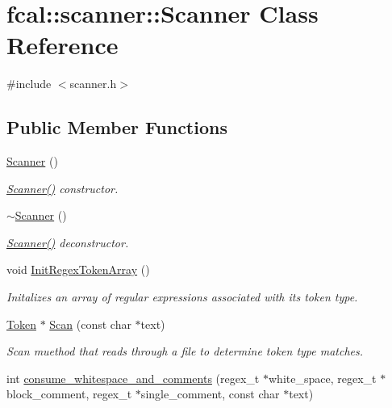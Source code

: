 \hypertarget{classfcal_1_1scanner_1_1Scanner}{}\section{fcal\+:\+:scanner\+:\+:Scanner Class Reference}
\label{classfcal_1_1scanner_1_1Scanner}


{\ttfamily \#include $<$scanner.\+h$>$}

\subsection*{Public Member Functions}
\begin{DoxyCompactItemize}
\item 
\hyperlink{classfcal_1_1scanner_1_1Scanner_a606874481764d7a73f55364a32f09e56}{Scanner} ()
\begin{DoxyCompactList}\small\item\em \hyperlink{classfcal_1_1scanner_1_1Scanner_a606874481764d7a73f55364a32f09e56}{Scanner()} constructor. \end{DoxyCompactList}\item 
\hyperlink{classfcal_1_1scanner_1_1Scanner_a7a35882ef749209bce3146916e3a8aec}{$\sim$\+Scanner} ()\hypertarget{classfcal_1_1scanner_1_1Scanner_a7a35882ef749209bce3146916e3a8aec}{}\label{classfcal_1_1scanner_1_1Scanner_a7a35882ef749209bce3146916e3a8aec}

\begin{DoxyCompactList}\small\item\em \hyperlink{classfcal_1_1scanner_1_1Scanner_a606874481764d7a73f55364a32f09e56}{Scanner()} deconstructor. \end{DoxyCompactList}\item 
void \hyperlink{classfcal_1_1scanner_1_1Scanner_a20d520febc54e6dfce573c4cde7a589b}{Init\+Regex\+Token\+Array} ()
\begin{DoxyCompactList}\small\item\em Initalizes an array of regular expressions associated with its token type. \end{DoxyCompactList}\item 
\hyperlink{classfcal_1_1scanner_1_1Token}{Token} $\ast$ \hyperlink{classfcal_1_1scanner_1_1Scanner_afe81aba5714ee2132baaf9546b08dc87}{Scan} (const char $\ast$text)
\begin{DoxyCompactList}\small\item\em Scan muethod that reads through a file to determine token type matches. \end{DoxyCompactList}\item 
int \hyperlink{classfcal_1_1scanner_1_1Scanner_a5a4bdc79ef02c9e65467a94594dfa0d0}{consume\+\_\+whitespace\+\_\+and\+\_\+comments} (regex\+\_\+t $\ast$white\+\_\+space, regex\+\_\+t $\ast$block\+\_\+comment, regex\+\_\+t $\ast$single\+\_\+comment, const char $\ast$text)
\end{DoxyCompactItemize}
